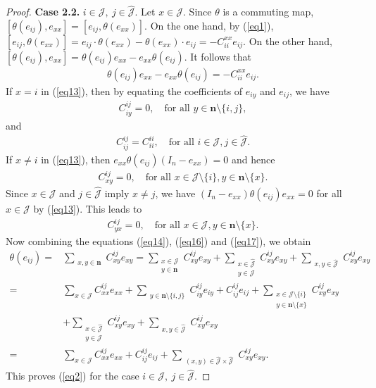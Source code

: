 \documentclass[10pt,a4paper]{amsart}
\begin{document}
\begin{proof}
\textbf{Case 2.2.} $ i \in \mathcal{J},~j \in \hat{\mathcal{J}} $. Let $ x \in \mathcal{J} $. Since $ \theta $ is a commuting map, $ [\theta(e_{ij}), e_{xx}] = [e_{ij}, \theta(e_{xx})] $.
On the one hand, by (\ref{eq1}),
$
[e_{ij}, \theta(e_{xx})] = e_{ij} \cdot  \theta(e_{xx}) - \theta(e_{xx}) \cdot  e_{ij} = -C_{ii}^{xx} e_{ij}.
$
On the other hand, $ [\theta(e_{ij}), e_{xx}] = \theta(e_{ij}) e_{xx} - e_{xx} \theta(e_{ij}) $.
It follows that
 \begin{align}\label{eq13}
\theta(e_{ij}) e_{xx} - e_{xx} \theta(e_{ij}) = -C_{ii}^{xx} e_{ij} .
 \end{align}
If $ x = i $ in  (\ref{eq13}), then  by equating the coefficients of $ e_{iy} $ and $ e_{ij} $, we have
 \begin{align}\label{eq14}
C_{iy}^{ij} = 0, \quad \text{for all } y \in \mathbf{n} \setminus \{i, j\},
 \end{align}
and
 \begin{align}\label{eq15}
C_{ij}^{ij} = C_{ii}^{ii},\quad \text{for all } i \in \mathcal{J}, j \in \hat{\mathcal{J}}. 
 \end{align}
If $ x \neq i $ in (\ref{eq13}), then  $ e_{xx} \theta(e_{ij}) (I_n - e_{xx}) = 0 $ and hence
 \begin{align}\label{eq16}
C_{xy}^{ij} = 0, \quad \text{for all } x \in \mathcal{J} \setminus \{i\}, y \in \mathbf{n} \setminus \{x\}.
 \end{align}
Since $ x \in \mathcal{J}$ and $ j \in \hat{\mathcal{J}} $ imply  $ x \neq j $, we have $ (I_n - e_{xx}) \theta(e_{ij}) e_{xx} = 0 $ for all $x\in \mathcal{J}$ by (\ref{eq13}). This leads to
 \begin{align}\label{eq17}
C_{yx}^{ij} = 0, \quad \text{for all } x \in \mathcal{J}, y \in \mathbf{n} \setminus \{x\}.
 \end{align}
Now combining the equations (\ref{eq14}), (\ref{eq16}) and (\ref{eq17}), we obtain
\[
\begin{aligned}
\theta(e_{ij}) 
=& \sum_{\substack{x,y \in \mathbf{n}}} C_{xy}^{ij} e_{xy}=\sum_{\substack{x \in \mathcal{J} \\ y \in \mathbf{n}}} C_{xy}^{ij} e_{xy} + \sum_{\substack{x \in \hat{\mathcal{J}} \\ y \in \mathcal{J}}} C_{xy}^{ij} e_{xy} + \sum_{\substack{x,y \in \hat{\mathcal{J}}}} C_{xy}^{ij} e_{xy} \\
=& \sum_{x \in \mathcal{J}} C_{xx}^{ij} e_{xx} + \sum_{\substack{y \in \mathbf{n}\setminus \{i,j\} }} C_{iy}^{ij} e_{iy}+C_{ij}^{ij} e_{ij}
+\sum_{\substack{x \in \mathcal{J}\setminus \{i\} \\y \in \mathbf{n}\setminus \{x\} }} C_{xy}^{ij} e_{xy} \\
&+\sum_{\substack{x \in \hat{\mathcal{J}}\\y \in \mathcal{J} }} C_{xy}^{ij} e_{xy}+ \sum_{\substack{x,y \in \hat{\mathcal{J}}}} C_{xy}^{ij} e_{xy} \\
=& \sum_{x \in \mathcal{J}} C_{xx}^{ij} e_{xx} + C_{ij}^{ij} e_{ij} + 
 \sum_{\substack{(x,y) \in \hat{\mathcal{J}}\times \hat{\mathcal{J}}}} C_{xy}^{ij} e_{xy}.
\end{aligned}
\]
This proves (\ref{eq2}) for the case $i \in \mathcal{J}, ~j \in \hat{\mathcal{J}}$.


\end{proof}
\end{document}
